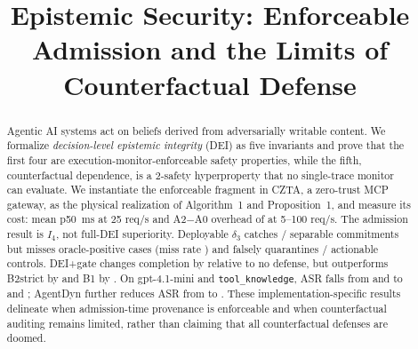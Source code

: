 \documentclass[conference,compsoc]{IEEEtran}
\theoremstyle{definition}
\theoremstyle{plain}
\newcommand{\Ifour}{\ensuremath{I_4}}
\begin{document}

\title{Epistemic Security: Enforceable Admission and the Limits of Counterfactual Defense}

\author{
}

\maketitle

\begin{abstract}
Agentic AI systems act on beliefs derived from adversarially writable
content. We formalize \emph{decision-level epistemic integrity} (DEI)
as five invariants and prove that the first four are
execution-monitor-enforceable safety properties, while the fifth,
counterfactual dependence, is a 2-safety hyperproperty that no
single-trace monitor can evaluate. We instantiate the enforceable
fragment in CZTA, a zero-trust MCP gateway, as the physical realization
of Algorithm~1 and Proposition~1, and measure its cost: mean p50
\RqFiveATwoTwentyFiveMedian\,ms at 25 req/s and A2$-$A0 overhead of
\RqFiveOverheadRange{} at 5--100 req/s. The admission result is
\Ifour, not full-DEI superiority. Deployable $\delta_3$ catches
\RqTwoSeparableDeltaThreeK/\RqTwoSeparableDeltaThreeN{} separable
commitments but misses \RqTwoDeltaThreeFn{} oracle-positive cases
(miss rate \RqTwoDeltaThreeMissRate) and falsely quarantines
\RqTwoHonestDeltaThreeK/\RqTwoHonestDeltaThreeN{} actionable controls.
DEI+gate changes completion by \RqThreeUtilDeiGatePairedRD{} relative
to no defense, but outperforms B2strict by
\RqThreeUtilDeiGateVsBTwoStrictPairedRD{} and B1 by
\RqThreeUtilDeiGateVsBOnePairedRD. On gpt-4.1-mini and
\texttt{tool\_knowledge}, ASR falls from
\RqFourASecNoDefenseASR{} and \RqFourCSecNoDefenseASR{} to
\RqFourASecDeiASR{} and \RqFourCSecDeiASR; AgentDyn further reduces ASR
from \RqAgentDynSecNoDefenseASR{} to \RqAgentDynSecDeiASR. These
implementation-specific results delineate when admission-time
provenance is enforceable and when counterfactual auditing remains
limited, rather than claiming that all counterfactual defenses are
doomed.
\end{abstract}
\end{document}
